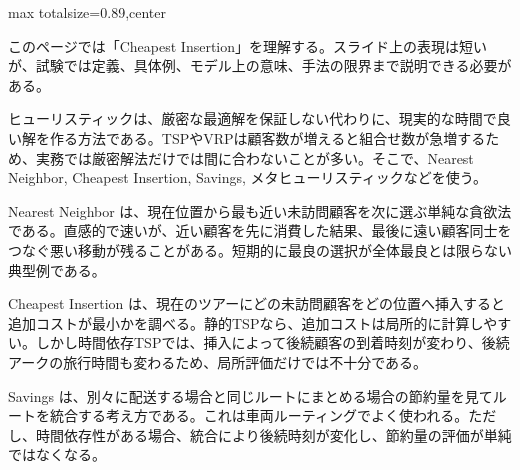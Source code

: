 \begin{minipage}[t]{0.58\textwidth}
\begin{adjustbox}{max totalsize={\textwidth}{0.89\textheight},center}
\begin{minipage}{\textwidth}\scriptsize
{}このページでは「Cheapest Insertion」を理解する。スライド上の表現は短いが、試験では定義、具体例、モデル上の意味、手法の限界まで説明できる必要がある。\par
ヒューリスティックは、厳密な最適解を保証しない代わりに、現実的な時間で良い解を作る方法である。TSPやVRPは顧客数が増えると組合せ数が急増するため、実務では厳密解法だけでは間に合わないことが多い。そこで、Nearest Neighbor, Cheapest Insertion, Savings, メタヒューリスティックなどを使う。\par
Nearest Neighbor は、現在位置から最も近い未訪問顧客を次に選ぶ単純な貪欲法である。直感的で速いが、近い顧客を先に消費した結果、最後に遠い顧客同士をつなぐ悪い移動が残ることがある。短期的に最良の選択が全体最良とは限らない典型例である。\par
Cheapest Insertion は、現在のツアーにどの未訪問顧客をどの位置へ挿入すると追加コストが最小かを調べる。静的TSPなら、追加コストは局所的に計算しやすい。しかし時間依存TSPでは、挿入によって後続顧客の到着時刻が変わり、後続アークの旅行時間も変わるため、局所評価だけでは不十分である。\par
Savings は、別々に配送する場合と同じルートにまとめる場合の節約量を見てルートを統合する考え方である。これは車両ルーティングでよく使われる。ただし、時間依存性がある場合、統合により後続時刻が変化し、節約量の評価が単純ではなくなる。\par

\end{minipage}
\end{adjustbox}
\end{minipage}
